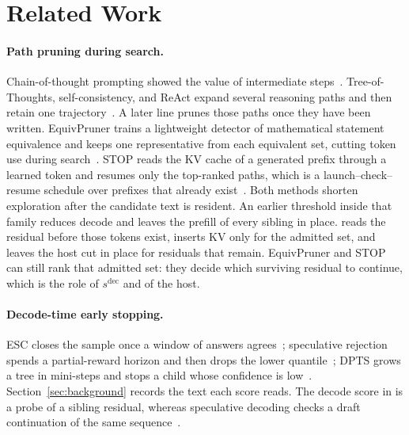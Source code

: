 \section{Related Work}
\label{sec:related}

\paragraph{Path pruning during search.}
Chain-of-thought prompting showed the value of intermediate steps~\citep{cot}.
Tree-of-Thoughts, self-consistency, and ReAct expand several reasoning paths and then retain one trajectory~\citep{tot,selfconsistency,react}.
A later line prunes those paths once they have been written.
EquivPruner trains a lightweight detector of mathematical statement equivalence and keeps one representative from each equivalent set, cutting token use during search~\citep{equivpruner}.
STOP reads the KV cache of a generated prefix through a learned token and resumes only the top-ranked paths, which is a launch--check--resume schedule over prefixes that already exist~\citep{stop}.
Both methods shorten exploration after the candidate text is resident.
An earlier threshold inside that family reduces decode and leaves the prefill of every sibling in place.
\sys reads the residual before those tokens exist, inserts KV only for the admitted set, and leaves the host cut in place for residuals that remain.
EquivPruner and STOP can still rank that admitted set: they decide which surviving residual to continue, which is the role of $s^{\mathrm{dec}}$ and of the host.

\paragraph{Decode-time early stopping.}
ESC closes the sample once a window of answers agrees~\citep{esc}; speculative rejection spends a partial-reward horizon and then drops the lower quantile~\citep{specrej}; DPTS grows a tree in mini-steps and stops a child whose confidence is low~\citep{dpts}.
Section~\ref{sec:background} records the text each score reads.
The decode score in \sys is a probe of a sibling residual, whereas speculative decoding checks a draft continuation of the same sequence~\citep{speculative}.

